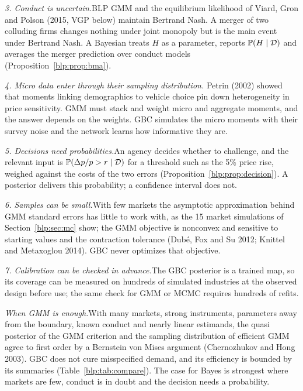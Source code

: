 \medskip\noindent\textit{3. Conduct is uncertain.}\enspace BLP GMM and the equilibrium likelihood of Viard, Gron and Polson (2015, VGP below) maintain
Bertrand Nash. A merger of two colluding firms changes nothing under joint monopoly but is the main event under Bertrand Nash. A Bayesian treats $H$ as a parameter, reports $\mathbb{P}(H\mid\mathcal{D})$ and
averages the merger prediction over conduct models (Proposition~\ref{blp:prop:bma}). 

\medskip\noindent\textit{4. Micro data enter through their sampling distribution.}\enspace
Petrin (2002) showed that moments linking demographics to vehicle choice pin down heterogeneity in price sensitivity. GMM must stack and weight micro and aggregate moments, and the
answer depends on the weights. GBC simulates the micro moments with their survey noise and the network learns how informative they are.

\medskip\noindent\textit{5. Decisions need probabilities.}\enspace An agency decides whether to challenge, and the relevant input is $\mathbb{P}(\Delta p/p > r\mid\mathcal{D})$ for a threshold such as the 5\%
price rise, weighed against the costs of the two errors (Proposition~\ref{blp:prop:decision}). A posterior delivers this probability; a confidence interval does not.

\medskip\noindent\textit{6. Samples can be small.}\enspace With few markets the asymptotic approximation behind GMM standard errors has little to work with, as the 15 market simulations of Section~\ref{blp:sec:mc} show; the GMM objective is
nonconvex and sensitive to starting values and the contraction tolerance
(Dub\'e, Fox and Su 2012; Knittel and Metaxoglou 2014). GBC never optimizes that objective.

\medskip\noindent\textit{7. Calibration can be checked in advance.}\enspace The GBC posterior is a
trained map, so its coverage can be measured on hundreds of simulated industries at the observed
design before use; the same check for GMM or MCMC requires hundreds of refits.

\medskip\noindent\textit{When GMM is enough.}\enspace With many markets, strong instruments,
parameters away from the boundary, known conduct and nearly linear estimands, the quasi posterior of the GMM criterion and
the sampling distribution of efficient GMM agree to first order by a Bernstein von Mises argument
(Chernozhukov and Hong 2003). GBC does not cure misspecified demand, and its
efficiency is bounded by its summaries (Table~\ref{blp:tab:compare}). The case for Bayes is strongest
where markets are few, conduct is in doubt and the decision needs a probability.

